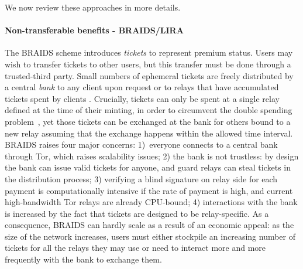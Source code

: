 

We now review these approaches in more details. 

\paragraph*{Non-transferable benefits - BRAIDS/LIRA} The BRAIDS scheme
introduces \emph{tickets} to represent premium status. Users may wish
to transfer tickets to other users, but this transfer must be done
through a trusted-third party.  Small numbers of ephemeral tickets are
freely distributed by a central \emph{bank} to any client upon request
or to relays that have accumulated tickets spent by clients . Crucially, tickets can only be spent at a single relay
defined at the time of their minting, in order to circumvent the
double spending problem~\cite{jansen2010recruiting}, yet those tickets
can be exchanged at the bank for others bound to a new relay assuming
that the exchange happens within the allowed time interval. BRAIDS
raises four major concerns: 1)~everyone connects to a central bank
through Tor, which raises scalability issues; 2) the bank is not
trustless: by design the bank can issue valid tickets for anyone, and
guard relays can steal tickets in the distribution process; 3)
verifying a blind signature on relay side for each payment is
computationally intensive if the rate of payment is high, and current
high-bandwidth Tor relays are already CPU-bound; 4) interactions with
the bank is increased by the fact that tickets are designed to be
relay-specific. As a consequence, BRAIDS can hardly scale as a result
of an economic appeal: as the size of the network increases, users
must either stockpile an increasing number of tickets for all the
relays they may use or need to interact more and more frequently with
the bank to exchange them.

